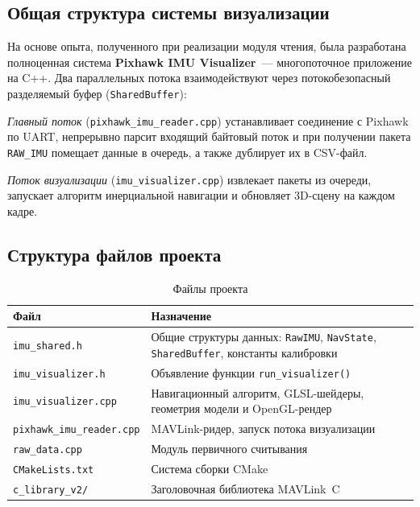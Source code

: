 \documentclass[../main.tex]{subfiles}
\begin{document}
	
\subsection{Общая структура системы визуализации}

На основе опыта, полученного при реализации модуля чтения, была
разработана полноценная система \textbf{Pixhawk IMU Visualizer}~---
многопоточное приложение на C++. Два параллельных потока взаимодействуют
через потокобезопасный разделяемый буфер (\texttt{SharedBuffer}):
 
\textit{Главный поток} (\texttt{pixhawk\_imu\_reader.cpp}) устанавливает
соединение с Pixhawk по UART, непрерывно парсит входящий байтовый поток
и при получении пакета \texttt{RAW\_IMU} помещает данные в очередь, а также
дублирует их в CSV-файл.
 
\textit{Поток визуализации} (\texttt{imu\_visualizer.cpp}) извлекает пакеты
из очереди, запускает алгоритм инерциальной навигации и обновляет 3D-сцену на
каждом кадре.


\subsection{Структура файлов проекта}

\begin{table}[H]
\centering
\caption{Файлы проекта}
\label{tab:files}
\begin{tabularx}{\textwidth}{|l|X|}
\hline
\textbf{Файл} & \textbf{Назначение} \\
\hline
\texttt{imu\_shared.h}            & Общие структуры данных: \texttt{RawIMU},
                                    \texttt{NavState}, \texttt{SharedBuffer},
                                    константы калибровки \\
\hline
\texttt{imu\_visualizer.h}        & Объявление функции \texttt{run\_visualizer()} \\
\hline
\texttt{imu\_visualizer.cpp}      & Навигационный алгоритм, GLSL-шейдеры,
                                    геометрия модели и OpenGL-рендер \\
\hline
\texttt{pixhawk\_imu\_reader.cpp} & MAVLink-ридер, запуск потока визуализации \\
\hline
\texttt{raw\_data.cpp}            & Модуль первичного считывания \\
\hline
\texttt{CMakeLists.txt}           & Система сборки CMake \\
\hline
\texttt{c\_library\_v2/}          & Заголовочная библиотека MAVLink~C~\cite{mavlink_docs} \\
\hline
\end{tabularx}
\end{table}
\end{document}
